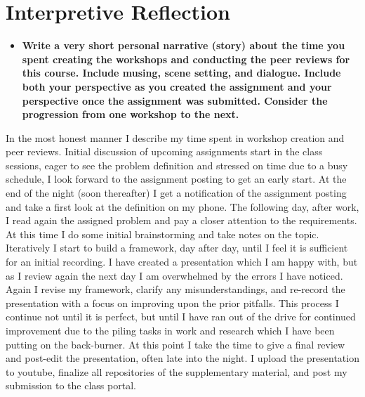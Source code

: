 \documentclass[12pt]{article}
\begin{document}
\section{Interpretive Reflection}
\begin{itemize}
    \item \textbf{Write a very short personal narrative (story) about the time you spent creating the workshops and conducting the peer reviews for this course. Include musing, scene setting, and dialogue. Include both your perspective as you created the assignment and your perspective once the assignment was submitted.  Consider the progression from one workshop to the next.}
\end{itemize}

In the most honest manner I describe my time spent in workshop creation and peer reviews. Initial discussion of upcoming assignments start in the class sessions, eager to see the problem definition and stressed on time due to a busy schedule, I look forward to the assignment posting to get an early start. At the end of the night (soon thereafter) I get a notification of the assignment posting and take a first look at the definition on my phone. The following day, after work, I read again the assigned problem and pay a closer attention to the requirements. At this time I do some initial brainstorming and take notes on the topic. Iteratively I start to build a framework, day after day, until I feel it is sufficient for an initial recording. I have created a presentation which I am happy with, but as I review again the next day I am overwhelmed by the errors I have noticed. Again I revise my framework, clarify any misunderstandings, and re-record the presentation with a focus on improving upon the prior pitfalls. This process I continue not until it is perfect, but until I have ran out of the drive for continued improvement due to the piling tasks in work and research which I have been putting on the back-burner. At this point I take the time to give a final review and post-edit the presentation, often late into the night. I upload the presentation to youtube, finalize all repositories of the supplementary material, and post my submission to the class portal.
\end{document}
